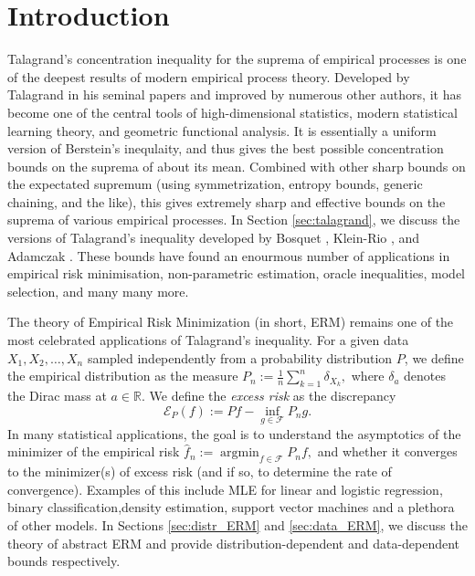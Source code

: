 \section{Introduction}\label{sec:introduction}

Talagrand's concentration inequality for the suprema of empirical processes is one of the deepest results of modern empirical process theory. Developed by Talagrand in his seminal papers \cite{Talagrand1994, talagrand1996new, talagrand1996new2} and improved by numerous other authors, it has become one of the central tools of high-dimensional statistics, modern statistical learning theory, and geometric functional analysis. It is essentially a uniform version of Berstein's inequlaity, and thus gives the best possible concentration bounds on the suprema of about its mean. Combined with other sharp bounds on the expectated supremum (using symmetrization, entropy bounds, generic chaining, and the like), this gives extremely sharp and effective bounds on the suprema of various empirical processes. In Section \ref{sec:talagrand}, we discuss the versions of Talagrand's inequality developed by Bosquet \cite{bousquet2002bennett}, Klein-Rio \cite{klein2005concentration}, and Adamczak \cite{adamczak2008tail}. These bounds have found an enourmous number of applications in empirical risk minimisation, non-parametric estimation, oracle inequalities, model selection, and many many more.

The theory of Empirical Risk Minimization (in short, ERM) remains one of the most celebrated applications of Talagrand's inequality. For a given data $X_1, X_2, \dots, X_n$ sampled independently from a probability distribution $P$, we define the empirical distribution as the measure \(P_n := \frac{1}{n}\sum_{k=1}^n \delta_{X_k},\) where $\delta_a$ denotes the Dirac mass at $a \in \mathbb{R}$. We define the \emph{excess risk} as the discrepancy
\[\mathcal{E}_P(f) := Pf - \inf_{g \in \mathcal{F}} P_n g.\] In many statistical applications, the goal is to understand the asymptotics of the minimizer of the empirical risk $\hat{f}_n := \operatorname{argmin}_{f \in \mathcal{F}} P_n f,$ and whether it converges to the minimizer(s) of excess risk (and if so, to determine the rate of convergence). Examples of this include MLE for linear and logistic regression, binary classification,density estimation, support vector machines and a plethora of other models. In Sections \ref{sec:distr_ERM} and \ref{sec:data_ERM}, we discuss the theory of abstract ERM and provide distribution-dependent and data-dependent bounds respectively.

